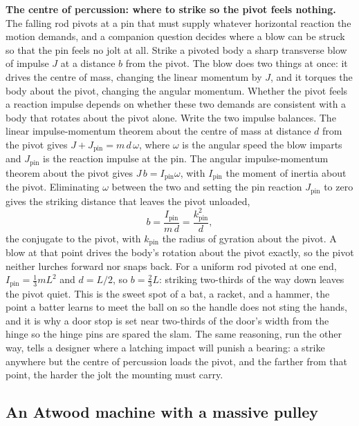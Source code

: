 \begin{mastery}
\textbf{The centre of percussion: where to strike so the pivot feels
nothing.} The falling rod pivots at a pin that must supply whatever
horizontal reaction the motion demands, and a companion question decides
where a blow can be struck so that the pin feels no jolt at all. Strike a
pivoted body a sharp transverse blow of impulse $J$ at a distance $b$
from the pivot. The blow does two things at once: it drives the centre of
mass, changing the linear momentum by $J$, and it torques the body about
the pivot, changing the angular momentum. Whether the pivot feels a
reaction impulse depends on whether these two demands are consistent with
a body that rotates about the pivot alone. Write the two impulse
balances. The linear impulse-momentum theorem about the centre of mass at
distance $d$ from the pivot gives $J+J_{\text{pin}}=m\,d\,\omega$, where
$\omega$ is the angular speed the blow imparts and $J_{\text{pin}}$ is the
reaction impulse at the pin. The angular impulse-momentum theorem about
the pivot gives $J\,b=I_{\text{pin}}\omega$, with $I_{\text{pin}}$ the
moment of inertia about the pivot. Eliminating $\omega$ between the two
and setting the pin reaction $J_{\text{pin}}$ to zero gives the striking
distance that leaves the pivot unloaded,
\[
b=\frac{I_{\text{pin}}}{m\,d}=\frac{k_{\text{pin}}^{2}}{d},
\]
the  conjugate to the pivot, with
$k_{\text{pin}}$ the radius of gyration about the pivot. A blow at that
point drives the body's rotation about the pivot exactly, so the pivot
neither lurches forward nor snaps back. For a uniform rod pivoted at one
end, $I_{\text{pin}}=\tfrac{1}{3}mL^{2}$ and $d=L/2$, so $b=\tfrac{2}{3}L$:
striking two-thirds of the way down leaves the pivot quiet. This is the
sweet spot of a bat, a racket, and a hammer, the point a batter learns to
meet the ball on so the handle does not sting the hands, and it is why a
door stop is set near two-thirds of the door's width from the hinge so
the hinge pins are spared the slam. The same reasoning, run the other
way, tells a designer where a latching impact will punish a bearing: a
strike anywhere but the centre of percussion loads the pivot, and the
farther from that point, the harder the jolt the mounting must carry.
\end{mastery}

\subsection{An Atwood machine with a massive pulley}

